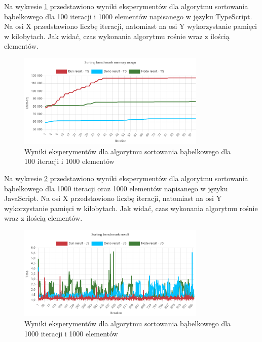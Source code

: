 Na wykresie \ref{fig:quick_sorting_e2_memory_ts} przedstawiono wyniki eksperymentów dla algorytmu sortowania bąbelkowego dla 100 iteracji i 1000 elementów napisanego w języku TypeScript. Na osi X przedstawiono liczbę iteracji, natomiast na osi Y wykorzystanie pamięci w kilobytach. Jak widać, czas wykonania algorytmu rośnie wraz z ilością elementów.
\begin{figure}[H]
  \centering
  \includegraphics[width=0.8\textwidth]{Figures/sorting/quick/e2_memory_ts.png}
  \caption{Wyniki eksperymentów dla algorytmu sortowania bąbelkowego dla 100 iteracji i 1000 elementów}
  \label{fig:quick_sorting_e2_memory_ts}
\end{figure}

Na wykresie \ref{fig:quick_sorting_e3} przedstawiono wyniki eksperymentów dla algorytmu sortowania bąbelkowego dla 1000 iteracji oraz 1000 elementów napisanego w języku JavaScript. Na osi X przedstawiono liczbę iteracji, natomiast na osi Y wykorzystanie pamięci w kilobytach. Jak widać, czas wykonania algorytmu rośnie wraz z ilością elementów.
\begin{figure}[H]
  \centering
  \includegraphics[width=0.8\textwidth]{Figures/sorting/quick/e3_js.png}
  \caption{Wyniki eksperymentów dla algorytmu sortowania bąbelkowego dla 1000 iteracji i 1000 elementów}
  \label{fig:quick_sorting_e3}
\end{figure}

